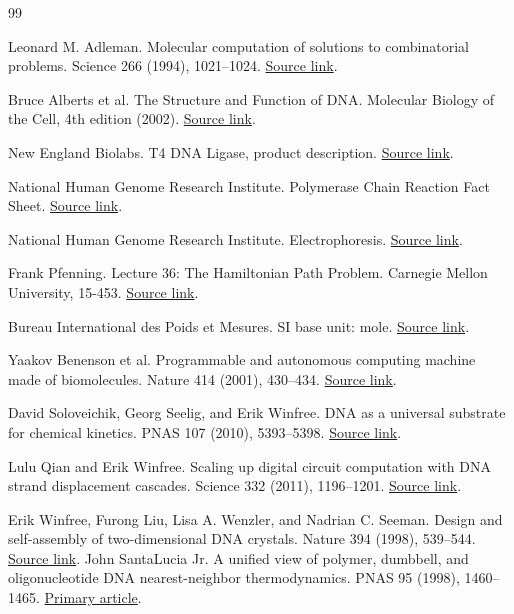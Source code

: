 \begin{thebibliography}{99}
 Leonard M. Adleman. Molecular computation of solutions to combinatorial problems. Science 266 (1994), 1021--1024. \href{https://computingbiology.github.io/docs/adleman1994.pdf}{Source link}.

 Bruce Alberts et al. The Structure and Function of DNA. Molecular Biology of the Cell, 4th edition (2002). \href{https://www.ncbi.nlm.nih.gov/books/NBK26821/}{Source link}.

 New England Biolabs. T4 DNA Ligase, product description. \href{https://www.neb.com/en-us/products/m0202-t4-dna-ligase}{Source link}.

 National Human Genome Research Institute. Polymerase Chain Reaction Fact Sheet. \href{https://www.genome.gov/about-genomics/fact-sheets/Polymerase-Chain-Reaction-Fact-Sheet}{Source link}.

 National Human Genome Research Institute. Electrophoresis. \href{https://www.genome.gov/genetics-glossary/Electrophoresis}{Source link}.

 Frank Pfenning. Lecture 36: The Hamiltonian Path Problem. Carnegie Mellon University, 15-453. \href{https://www.cs.cmu.edu/~fp/courses/flac/lectures/lecture36.html}{Source link}.

 Bureau International des Poids et Mesures. SI base unit: mole. \href{https://www.bipm.org/en/si-base-units/mole}{Source link}.

 Yaakov Benenson et al. Programmable and autonomous computing machine made of biomolecules. Nature 414 (2001), 430--434. \href{https://www.nature.com/articles/35106533}{Source link}.

 David Soloveichik, Georg Seelig, and Erik Winfree. DNA as a universal substrate for chemical kinetics. PNAS 107 (2010), 5393--5398. \href{https://doi.org/10.1073/pnas.0909380107}{Source link}.

 Lulu Qian and Erik Winfree. Scaling up digital circuit computation with DNA strand displacement cascades. Science 332 (2011), 1196--1201. \href{https://www.qianlab.caltech.edu/seesaw_digital_circuits2011.pdf}{Source link}.

 Erik Winfree, Furong Liu, Lisa A. Wenzler, and Nadrian C. Seeman. Design and self-assembly of two-dimensional DNA crystals. Nature 394 (1998), 539--544. \href{https://www.nature.com/articles/28998}{Source link}.
 John SantaLucia Jr. A unified view of polymer, dumbbell, and oligonucleotide DNA nearest-neighbor thermodynamics. PNAS 95 (1998), 1460--1465. \href{https://pmc.ncbi.nlm.nih.gov/articles/PMC19045/}{Primary article}.


\end{thebibliography}
